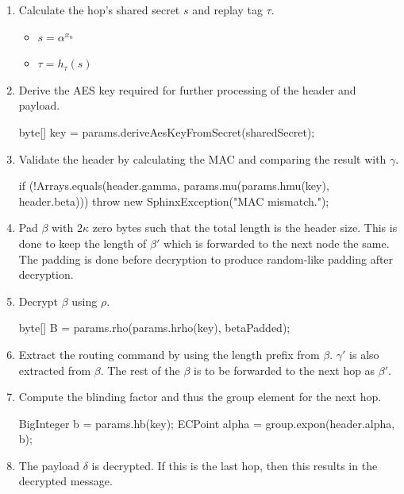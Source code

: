 \documentclass[final,dissertation.tex]{subfiles}
\begin{document}
\begin{enumerate}
	\item Calculate the hop's shared secret $s$ and replay tag $\tau$.
	\begin{itemize}
		\item $s = \alpha^{x_n}$
		\item $\tau = h_{\tau}(s)$
	\end{itemize}

	\item Derive the AES key required for further processing of the header and payload.
	\begin{javacode}
byte[] key = params.deriveAesKeyFromSecret(sharedSecret);
	\end{javacode}

	\item Validate the header by calculating the MAC and comparing the result with $\gamma$.
	\begin{javacode}
if (!Arrays.equals(header.gamma,
    params.mu(params.hmu(key), header.beta))) {
    throw new SphinxException("MAC mismatch.");
}
	\end{javacode}

	\item Pad $\beta$ with $2\kappa$ zero bytes such that the total length is the header size. This is done to keep the length of $\beta'$ which is forwarded to the next node the same. The padding is done before decryption to produce random-like padding after decryption.
	
	\item Decrypt $\beta$ using $\rho$.
	\begin{javacode}
byte[] B = params.rho(params.hrho(key), betaPadded);
	\end{javacode}

	\item Extract the routing command by using the length prefix from $\beta$. $\gamma'$ is also extracted from $\beta$. The rest of the $\beta$ is to be forwarded to the next hop as $\beta'$.
	
	\item Compute the blinding factor and thus the group element for the next hop.
		\begin{javacode}
BigInteger b = params.hb(key);
ECPoint alpha = group.expon(header.alpha, b);
		\end{javacode}
	
	\item The payload $\delta$ is decrypted. If this is the last hop, then this results in the decrypted message.
\end{enumerate}
\end{document}
